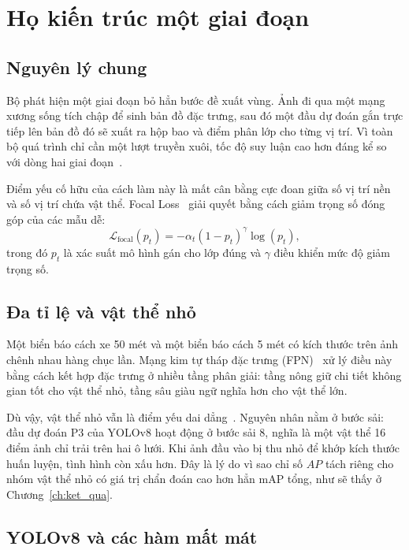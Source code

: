 \section{Họ kiến trúc một giai đoạn}

\subsection{Nguyên lý chung}

Bộ phát hiện một giai đoạn bỏ hẳn bước đề xuất vùng. Ảnh đi qua một mạng xương sống tích chập để
sinh bản đồ đặc trưng, sau đó một đầu dự đoán gắn trực tiếp lên bản đồ đó sẽ xuất ra hộp bao và
điểm phân lớp cho từng vị trí. Vì toàn bộ quá trình chỉ cần một lượt truyền xuôi, tốc độ suy luận
cao hơn đáng kể so với dòng hai giai đoạn~\cite{redmon2016yolo}.

Điểm yếu cố hữu của cách làm này là mất cân bằng cực đoan giữa số vị trí nền và số vị trí chứa vật
thể. Focal Loss~\cite{lin2017focal} giải quyết bằng cách giảm trọng số đóng góp của các mẫu dễ:
\begin{equation}
\label{eq:focal}
\mathcal{L}_{\text{focal}}(p_t) = -\alpha_t \left(1 - p_t\right)^{\gamma} \log(p_t),
\end{equation}
trong đó $p_t$ là xác suất mô hình gán cho lớp đúng và $\gamma$ điều khiển mức độ giảm trọng số.

\subsection{Đa tỉ lệ và vật thể nhỏ}

Một biển báo cách xe 50 mét và một biển báo cách 5 mét có kích thước trên ảnh chênh nhau hàng chục
lần. Mạng kim tự tháp đặc trưng (FPN)~\cite{lin2017fpn} xử lý điều này bằng cách kết hợp đặc trưng
ở nhiều tầng phân giải: tầng nông giữ chi tiết không gian tốt cho vật thể nhỏ, tầng sâu giàu ngữ
nghĩa hơn cho vật thể lớn.

Dù vậy, vật thể nhỏ vẫn là điểm yếu dai dẳng~\cite{tong2020smallobject}. Nguyên nhân nằm ở bước
sải: đầu dự đoán P3 của YOLOv8 hoạt động ở bước sải 8, nghĩa là một vật thể 16 điểm ảnh chỉ trải
trên hai ô lưới. Khi ảnh đầu vào bị thu nhỏ để khớp kích thước huấn luyện, tình hình còn xấu hơn.
Đây là lý do vì sao chỉ số $AP$ tách riêng cho nhóm vật thể nhỏ có giá trị chẩn đoán cao hơn hẳn
mAP tổng, như sẽ thấy ở Chương~\ref{ch:ket_qua}.

\subsection{YOLOv8 và các hàm mất mát}

